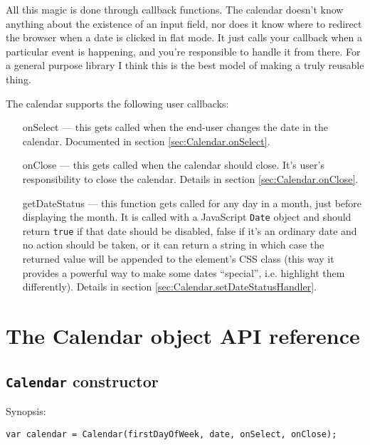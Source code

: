 \documentclass[a4paper,10pt]{article}
\begin{document}
All this magic is done through callback functions.  The calendar doesn't know
anything about the existence of an input field, nor does it know where to
redirect the browser when a date is clicked in flat mode.  It just calls your
callback when a particular event is happening, and you're responsible to handle
it from there.  For a general purpose library I think this is the best model of
making a truly reusable thing.

The calendar supports the following user callbacks:

\begin{itemize}

\item [onSelect] --- this gets called when the end-user changes the date in the
calendar.  Documented in section \ref{sec:Calendar.onSelect}.

\item [onClose] --- this gets called when the calendar should close.  It's
user's responsibility to close the calendar.  Details in section
\ref{sec:Calendar.onClose}.

\item [getDateStatus] --- this function gets called for any day in a month,
just before displaying the month.  It is called with a JavaScript \texttt{Date}
object and should return \texttt{true} if that date should be disabled, false
if it's an ordinary date and no action should be taken, or it can return a
string in which case the returned value will be appended to the element's CSS
class (this way it provides a powerful way to make some dates ``special'',
i.e. highlight them differently).  Details in section
\ref{sec:Calendar.setDateStatusHandler}.

\end{itemize}






\section{The Calendar object API reference}\label{sec:Calendar_reference}

\subsection{\texttt{Calendar} constructor}\label{sec:Calendar.constructor}

\noindent Synopsis:

\begin{verbatim}
var calendar = Calendar(firstDayOfWeek, date, onSelect, onClose);
\end{verbatim}
\end{document}
